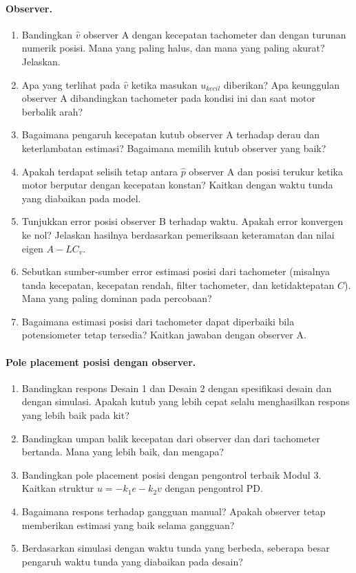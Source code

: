 \documentclass[11pt,a4paper]{article}
\begin{document}
\paragraph{Observer.}
\begin{enumerate}[resume]
\item Bandingkan $\hat{v}$ observer A dengan kecepatan tachometer dan dengan turunan numerik posisi. Mana yang paling halus, dan mana yang paling akurat? Jelaskan.
\item Apa yang terlihat pada $\hat{v}$ ketika masukan $u_{kecil}$ diberikan? Apa keunggulan observer A dibandingkan tachometer pada kondisi ini dan saat motor berbalik arah?
\item Bagaimana pengaruh kecepatan kutub observer A terhadap derau dan keterlambatan estimasi? Bagaimana memilih kutub observer yang baik?
\item Apakah terdapat selisih tetap antara $\hat{p}$ observer A dan posisi terukur ketika motor berputar dengan kecepatan konstan? Kaitkan dengan waktu tunda yang diabaikan pada model.
\item Tunjukkan error posisi observer B terhadap waktu. Apakah error konvergen ke nol? Jelaskan hasilnya berdasarkan pemeriksaan keteramatan dan nilai eigen $A - LC_v$.
\item Sebutkan sumber-sumber error estimasi posisi dari tachometer (misalnya tanda kecepatan, kecepatan rendah, filter tachometer, dan ketidaktepatan $C$). Mana yang paling dominan pada percobaan?
\item Bagaimana estimasi posisi dari tachometer dapat diperbaiki bila potensiometer tetap tersedia? Kaitkan jawaban dengan observer A.
\end{enumerate}

\paragraph{Pole placement posisi dengan observer.}
\begin{enumerate}[resume]
\item Bandingkan respons Desain 1 dan Desain 2 dengan spesifikasi desain dan dengan simulasi. Apakah kutub yang lebih cepat selalu menghasilkan respons yang lebih baik pada kit?
\item Bandingkan umpan balik kecepatan dari observer dan dari tachometer bertanda. Mana yang lebih baik, dan mengapa?
\item Bandingkan pole placement posisi dengan pengontrol terbaik Modul 3. Kaitkan struktur $u = -k_1 e - k_2 v$ dengan pengontrol PD.
\item Bagaimana respons terhadap gangguan manual? Apakah observer tetap memberikan estimasi yang baik selama gangguan?
\item Berdasarkan simulasi dengan waktu tunda yang berbeda, seberapa besar pengaruh waktu tunda yang diabaikan pada desain?
\end{enumerate}
\end{document}
